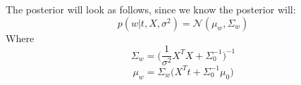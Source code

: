 The posterior will look as follows, since we know the posterior will:$$
p(w|t,X,\sigma^2) = \mathcal{N}(\mu_w,\Sigma_w)
$$
Where
$$
\Sigma_w = \Big(\frac{1}{\sigma^2}X^TX + \Sigma_0^{-1}\Big)^{-1}
$$
$$
\mu_w = \Sigma_w \Big(X^Tt+\Sigma_0^{-1}\mu_0\Big)
$$